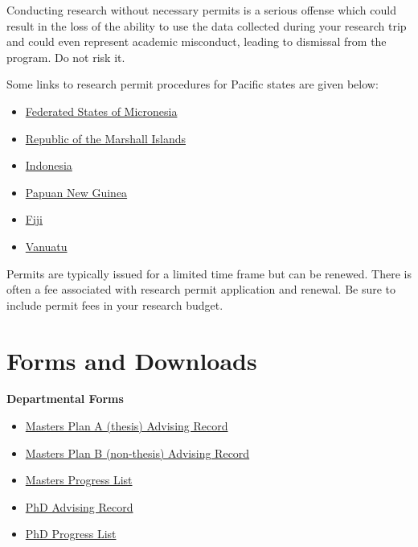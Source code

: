 \documentclass[
]{book}
\providecommand{\tightlist}{%
  \setlength{\itemsep}{0pt}\setlength{\parskip}{0pt}}
\begin{document}
Conducting research without necessary permits is a serious offense which could result in the loss of the ability to use the data collected during your research trip and could even represent academic misconduct, leading to dismissal from the program. Do not risk it.

Some links to research permit procedures for Pacific states are given below:

\begin{itemize}
\tightlist
\item
  \href{https://nach.gov.fm/research/}{Federated States of Micronesia}
\item
  \href{https://www.michpo.org/services/permits}{Republic of the Marshall Islands}
\item
  \href{https://klirensetik.brin.go.id/}{Indonesia}
\item
  \href{https://pngnri.org/images/CS/Research_in_PNG_Conditions_and_Guidelines_.pdf}{Papuan New Guinea}
\item
  \href{https://www.immigration.gov.fj/research-permit/}{Fiji}
\item
  \href{https://vanuatuculturalcentre.gov.vu/index.php/research/research-permits/research-policy}{Vanuatu}
\end{itemize}

Permits are typically issued for a limited time frame but can be renewed. There is often a fee associated with research permit application and renewal. Be sure to include permit fees in your research budget.

\chapter{Forms and Downloads}\label{forms}

\textbf{Departmental Forms}

\begin{itemize}
\tightlist
\item
  \href{files/MA_PlanA_advising.pdf}{Masters Plan A (thesis) Advising Record}
\item
  \href{files/MA_PlanB_advising.pdf}{Masters Plan B (non-thesis) Advising Record}
\item
  \href{files/MA_progress_list.pdf}{Masters Progress List}
\item
  \href{files/PhD_advising.pdf}{PhD Advising Record}
\item
  \href{files/PhD_progress_list.pdf}{PhD Progress List}
\end{itemize}
\end{document}
